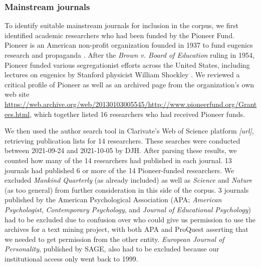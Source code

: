 \documentclass[12pt]{article}
\begin{document}
\hypertarget{mainstream-journals}{%
\subsubsection*{Mainstream journals}\label{mainstream-journals}}

To identify suitable mainstream journals for inclusion in the corpus, we first identified academic researchers who had been funded by the Pioneer Fund. Pioneer is an American non-profit organization founded in 1937 to fund eugenics research and propaganda \cite{TuckerFundingScientificRacism2002}. After the \emph{Brown v. Board of Education} ruling in 1954, Pioneer funded various segregationist efforts across the United States, including lectures on eugenics by Stanford physicist William Shockley \cite{JacksonScienceSegregationRace2005}. We reviewed a critical profile of Pioneer \cite{MillerPioneerFundBankrolling1994} as well as an archived page from the organization's own web site \url{https://web.archive.org/web/20130103005545/http://www.pioneerfund.org/Grantees.html}, which together listed 16 researchers who had received Pioneer funds.

We then used the author search tool in Clarivate's Web of Science platform \emph{{[}url{]}}, retrieving publication lists for 14 researchers. These searches were conducted between 2021-09-24 and 2021-10-05 by DJH. After parsing these results, we counted how many of the 14 researchers had published in each journal. 13 journals had published 6 or more of the 14 Pioneer-funded researchers. We excluded \emph{Mankind Quarterly} (as already included) as well as \emph{Science} and \emph{Nature} (as too general) from further consideration in this side of the corpus. 3 journals published by the American Psychological Association (APA; \emph{American Psychologist}, \emph{Contemporary Psychology}, and \emph{Journal of Educational Psychology}) had to be excluded due to confusion over who could give us permission to use the archives for a text mining project, with both APA and ProQuest asserting that we needed to get permission from the other entity. \emph{European Journal of Personality}, published by SAGE, also had to be excluded because our institutional access only went back to 1999.
\end{document}
